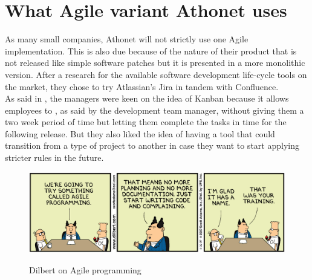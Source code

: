 \section{What Agile variant Athonet uses}
	As many small companies, Athonet will not strictly use one Agile implementation.
	This is also due because of the nature of their product that is not released like simple software patches but it is presented in a more monolithic version.
	After a research for the available software development life-cycle tools on the market, they chose to try Atlassian's Jira in tandem with Confluence.\\
	As said in , the managers were keen on the idea of Kanban because it allows employees to , as said by the development team manager, without giving them a two week period of time but letting them complete the tasks in time for the following release.
	But they also liked the idea of having a tool that could transition from a type of project to another in case they want to start applying stricter rules in the future.
	\begin{figure}[H]
		\centering
		\includegraphics[width=\textwidth]{resources/Dilbert_Training_Agile_Programming}\\
		\caption{Dilbert on Agile programming}
	\end{figure}


